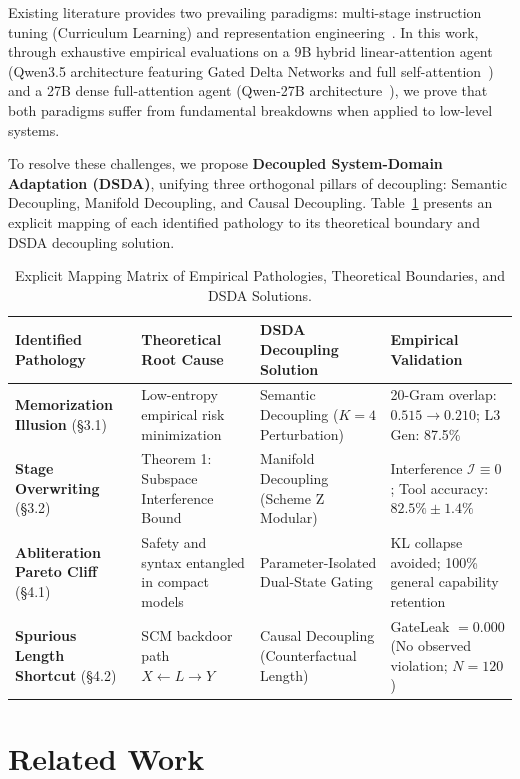 \documentclass{article}
\begin{document}
Existing literature provides two prevailing paradigms: multi-stage instruction tuning (Curriculum Learning) and representation engineering~\cite{zou2023representation,arditi2024refusal}. In this work, through exhaustive empirical evaluations on a 9B hybrid linear-attention agent (Qwen3.5 architecture featuring Gated Delta Networks and full self-attention~\cite{yang2024gated,orionllm2025oxcoder}) and a 27B dense full-attention agent (Qwen-27B architecture~\cite{qwen2024technical}), we prove that both paradigms suffer from fundamental breakdowns when applied to low-level systems.

To resolve these challenges, we propose \textbf{Decoupled System-Domain Adaptation (DSDA)}, unifying three orthogonal pillars of decoupling: Semantic Decoupling, Manifold Decoupling, and Causal Decoupling. Table~\ref{tab:mapping_matrix} presents an explicit mapping of each identified pathology to its theoretical boundary and DSDA decoupling solution.

\begin{table}[t]
\centering
\small
\caption{Explicit Mapping Matrix of Empirical Pathologies, Theoretical Boundaries, and DSDA Solutions.}
\label{tab:mapping_matrix}
\begin{tabular}{p{3.2cm}p{4.2cm}p{4.0cm}p{3.5cm}}
\toprule
\textbf{Identified Pathology} & \textbf{Theoretical Root Cause} & \textbf{DSDA Decoupling Solution} & \textbf{Empirical Validation} \\
\midrule
\textbf{Memorization Illusion} (§3.1) & Low-entropy empirical risk minimization & Semantic Decoupling ($K=4$ Perturbation) & 20-Gram overlap: $0.515 \to 0.210$; L3 Gen: 87.5\% \\
\textbf{Stage Overwriting} (§3.2) & Theorem 1: Subspace Interference Bound & Manifold Decoupling (Scheme Z Modular) & Interference $\mathcal{I} \equiv 0$; Tool accuracy: $82.5\% \pm 1.4\%$ \\
\textbf{Abliteration Pareto Cliff} (§4.1) & Safety and syntax entangled in compact models & Parameter-Isolated Dual-State Gating & KL collapse avoided; 100\% general capability retention \\
\textbf{Spurious Length Shortcut} (§4.2) & SCM backdoor path $X \leftarrow L \rightarrow Y$ & Causal Decoupling (Counterfactual Length) & GateLeak $= 0.000$ (No observed violation; $N=120$) \\
\bottomrule
\end{tabular}
\end{table}

\section{Related Work}
\end{document}
